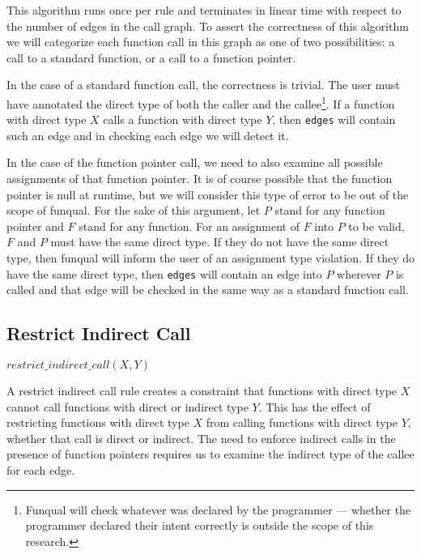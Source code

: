 This algorithm runs once per rule and terminates in linear time with respect to the number of edges in the call graph.  To assert the correctness of this algorithm we will categorize each function call in this graph as one of two possibilities:  a call to a standard function, or a call to a function pointer.

In the case of a standard function call, the correctness is trivial.  The user must have annotated the direct type of both the caller and the callee\footnote{Funqual will check whatever was declared by the programmer --- whether the programmer declared their intent correctly is outside the scope of this research.}.  If a function with direct type $X$ calls a function with direct type $Y$, then \lstinline{edges} will contain such an edge and in checking each edge we will detect it.  

In the case of the function pointer call, we need to also examine all possible assignments of that function pointer.  It is of course possible that the function pointer is null at runtime, but we will consider this type of error to be out of the scope of funqual.  For the sake of this argument, let $P$ stand for any function pointer and $F$ stand for any function.  For an assignment of $F$ into $P$ to be valid, $F$ and $P$ must have the same direct type.  If they do not have the same direct type, then funqual will inform the user of an assignment type violation.  If they do have the same direct type, then \lstinline{edges} will contain an edge into $P$ wherever $P$ is called and that edge will be checked in the same way as a standard function call.  

\subsection{Restrict Indirect Call}

\begin{center}
    $restrict\_indirect\_call(X, Y)$
\end{center}

A restrict indirect call rule creates a constraint that functions with direct type $X$ cannot call functions with direct or indirect type $Y$.  This has the effect of restricting functions with direct type $X$ from calling functions with direct type $Y$, whether that call is direct or indirect.  The need to enforce indirect calls in the presence of function pointers requires us to examine the indirect type of the callee for each edge.  

